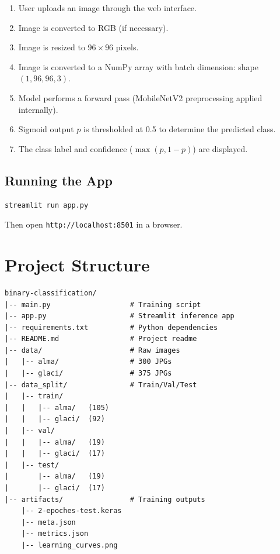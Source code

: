 \documentclass[12pt,a4paper]{article}
\begin{document}
\begin{enumerate}
    \item User uploads an image through the web interface.
    \item Image is converted to RGB (if necessary).
    \item Image is resized to $96 \times 96$ pixels.
    \item Image is converted to a NumPy array with batch dimension: shape $(1, 96, 96, 3)$.
    \item Model performs a forward pass (MobileNetV2 preprocessing applied internally).
    \item Sigmoid output $p$ is thresholded at 0.5 to determine the predicted class.
    \item The class label and confidence ($\max(p, 1-p)$) are displayed.
\end{enumerate}

\subsection{Running the App}

\begin{lstlisting}[language=bash]
streamlit run app.py
\end{lstlisting}

Then open \texttt{http://localhost:8501} in a browser.

\section{Project Structure}

\begin{lstlisting}[basicstyle=\ttfamily\footnotesize]
binary-classification/
|-- main.py                   # Training script
|-- app.py                    # Streamlit inference app
|-- requirements.txt          # Python dependencies
|-- README.md                 # Project readme
|-- data/                     # Raw images
|   |-- alma/                 # 300 JPGs
|   |-- glaci/                # 375 JPGs
|-- data_split/               # Train/Val/Test
|   |-- train/
|   |   |-- alma/   (105)
|   |   |-- glaci/  (92)
|   |-- val/
|   |   |-- alma/   (19)
|   |   |-- glaci/  (17)
|   |-- test/
|       |-- alma/   (19)
|       |-- glaci/  (17)
|-- artifacts/                # Training outputs
    |-- 2-epoches-test.keras
    |-- meta.json
    |-- metrics.json
    |-- learning_curves.png
\end{lstlisting}
\end{document}
